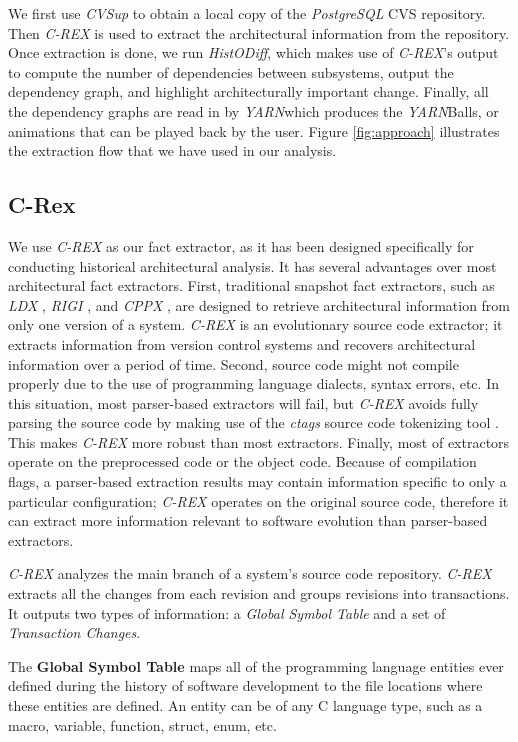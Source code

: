 \documentclass[times, 10pt,twocolumn]{article}
\newcommand{\crex}{\emph{C-REX}\xspace}
\newcommand{\yarn}{\emph{YARN\xspace}}
\newcommand{\YARN}{\yarn}
\newcommand{\postgresql}{\emph{PostgreSQL}\xspace}
\newcommand{\cvsup}{\emph{CVSup}\xspace}
\newcommand{\Subsection}[1]{\subsection{#1}}
\begin{document}

We first use \cvsup to obtain a local copy of the \postgresql CVS
repository.  Then \emph{C-REX} is used to extract the architectural
information from the repository.  Once extraction is done, we run
\emph{HistODiff}, which makes use of \emph{C-REX}'s output  to compute the
number of dependencies between subsystems, output the dependency graph, and
highlight architecturally important change.  Finally, all the dependency
graphs are read in by \YARN which produces the \YARN Balls, or animations
that can be played back by the user.  Figure \ref{fig:approach} illustrates
the extraction flow that we have used in our analysis.


\Subsection{C-Rex}



We use \emph{C-REX} \cite{crex} as our fact extractor, as it has been
designed specifically for conducting historical architectural analysis.
It has several advantages over most architectural fact extractors.
First, traditional snapshot fact extractors, such as \emph{LDX} \cite{ldx},
\emph{RIGI} \cite{rigi}, and \emph{CPPX} \cite{cppx}, are designed to
retrieve architectural information from only one version of a system.
\emph{C-REX} is an evolutionary source code extractor; it extracts
information from version control systems and recovers architectural
information over a period of time.  Second, source code might not compile
properly due to the use of programming language dialects,
syntax errors, etc.  In this situation, most parser-based extractors will
fail, but \emph{C-REX} avoids fully parsing the source code by making use
of the \emph{ctags} source code tokenizing tool \cite{ctags}.  This makes
\emph{C-REX} more robust than most extractors.  Finally, most of extractors
operate on the preprocessed code or the object code.  Because of
compilation flags, a parser-based extraction results may contain
information specific to only a particular configuration;  \emph{C-REX}
operates on the original source code, therefore it can extract more
information relevant to software evolution than parser-based extractors.

\emph{C-REX} analyzes the main branch of a system's source code repository.
\crex extracts all the changes from each revision and groups revisions into
transactions.  It outputs two types of information: a \emph{Global Symbol
Table} and a set of \emph{Transaction Changes}.

The \textbf{Global Symbol Table} maps all of the programming language
entities ever defined during the history of software development to the
file locations where these entities are defined.  An entity can be of any C
language type, such as a macro, variable, function, struct, enum, etc.
\end{document}
